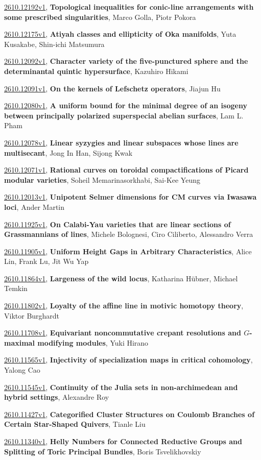 \documentclass[9pt, a4paper]{article}
\theoremstyle{plain}
\theoremstyle{definition}
\theoremstyle{remark}
\newcommand{\arxiv}[3]{\href{https://arxiv.org/abs/#1}{#1}, \textbf{\textcolor{arxivblue}{#2}}, #3}
\begin{document}
\arxiv{2610.12192v1}{Topological inequalities for conic-line arrangements with some prescribed singularities}{Marco Golla, Piotr Pokora}

\arxiv{2610.12175v1}{Atiyah classes and ellipticity of Oka manifolds}{Yuta Kusakabe, Shin-ichi Matsumura}

\arxiv{2610.12092v1}{Character variety of the five-punctured sphere and the determinantal quintic hypersurface}{Kazuhiro Hikami}

\arxiv{2610.12091v1}{On the kernels of Lefschetz operators}{Jiajun Hu}

\arxiv{2610.12080v1}{A uniform bound for the minimal degree of an isogeny between principally polarized superspecial abelian surfaces}{Lam L. Pham}

\arxiv{2610.12078v1}{Linear syzygies and linear subspaces whose lines are multisecant}{Jong In Han, Sijong Kwak}

\arxiv{2610.12071v1}{Rational curves on toroidal compactifications of Picard modular varieties}{Soheil Memarinasorkhabi, Sai-Kee Yeung}

\arxiv{2610.12013v1}{Unipotent Selmer dimensions for CM curves via Iwasawa loci}{Ander Martin}

\arxiv{2610.11925v1}{On Calabi-Yau varieties that are linear sections of Grassmannians of lines}{Michele Bolognesi, Ciro Ciliberto, Alessandro Verra}

\arxiv{2610.11905v1}{Uniform Height Gaps in Arbitrary Characteristics}{Alice Lin, Frank Lu, Jit Wu Yap}

\arxiv{2610.11864v1}{Largeness of the wild locus}{Katharina Hübner, Michael Temkin}

\arxiv{2610.11802v1}{Loyalty of the affine line in motivic homotopy theory}{Viktor Burghardt}

\arxiv{2610.11708v1}{Equivariant noncommutative crepant resolutions and $G$-maximal modifying modules}{Yuki Hirano}

\arxiv{2610.11565v1}{Injectivity of specialization maps in critical cohomology}{Yalong Cao}

\arxiv{2610.11545v1}{Continuity of the Julia sets in non-archimedean and hybrid settings}{Alexandre Roy}

\arxiv{2610.11427v1}{Categorified Cluster Structures on Coulomb Branches of Certain Star-Shaped Quivers}{Tianle Liu}

\arxiv{2610.11340v1}{Helly Numbers for Connected Reductive Groups and Splitting of Toric Principal Bundles}{Boris Tsvelikhovskiy}
\end{document}
